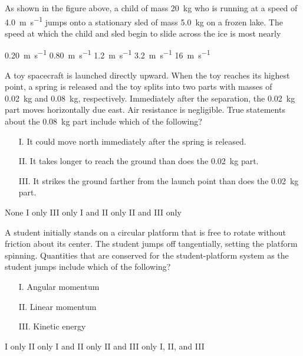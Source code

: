 \documentclass[12pt]{../oss-classkick-exam}
\begin{document}
\begin{questions}
  
  \question As shown in the figure above, a child of mass \SI{20}{\kilo\gram}
  who is running at a speed of \SI{4.0}{\metre\per\second} jumps onto a
  stationary sled of mass \SI{5.0}{\kilo\gram} on a frozen lake. The speed at
  which the child and sled begin to slide across the ice is most nearly
  \begin{choices}
    \choice \SI{.20}{\metre\per\second}
    \choice \SI{.80}{\metre\per\second}
    \choice \SI{1.2}{\metre\per\second}
    \choice \SI{3.2}{\metre\per\second}
    \choice \SI{16}{\metre\per\second}
  \end{choices}
  
  \question A toy spacecraft is launched directly upward. When the toy reaches
  its highest point, a spring is released and the toy splits into two parts
  with masses of \SI{.02}{\kilo\gram} and \SI{.08}{\kilo\gram}, respectively.
  Immediately after the separation, the \SI{.02}{\kilo\gram} part moves
  horizontally due east. Air resistance is negligible. True statements about
  the \SI{.08}{\kilo\gram} part include which of the following?
  \begin{enumerate}[nosep]
  \item[I.] It could move north immediately after the spring is released.
  \item[II.] It takes longer to reach the ground than does the
    \SI{.02}{\kilo\gram} part.
  \item[III.] It strikes the ground farther from the launch point than does the
    \SI{.02}{\kilo\gram} part.
  \end{enumerate}
  \begin{choices}
    \choice None
    \choice I only
    \choice III only
    \choice I and II only
    \choice II and III only
  \end{choices}
  
  \question A student initially stands on a circular platform that is free to
  rotate without friction about its center. The student jumps off tangentially,
  setting the platform spinning. Quantities that are conserved for the
  student-platform system as the student jumps include which of the following?
  \begin{enumerate}[nosep]
  \item[I.] Angular momentum
  \item[II.] Linear momentum
  \item[III.] Kinetic energy
  \end{enumerate}  
  \begin{choices}
    \choice I only
    \choice II only
    \choice I and II only
    \choice II and III only
    \choice I, II, and III
  \end{choices}
  

\end{questions}
\end{document}
